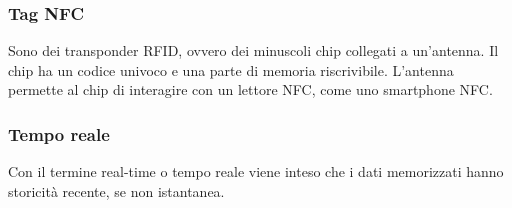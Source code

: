 \subsubsection*{Tag NFC} Sono dei transponder RFID, ovvero dei minuscoli chip collegati a un'antenna. Il chip ha un codice univoco e una parte di memoria riscrivibile. L'antenna permette al chip di interagire con un lettore NFC, come uno smartphone NFC.
\subsubsection*{Tempo reale} Con il termine real-time o tempo reale viene inteso che i dati memorizzati hanno storicità recente, se non istantanea.

